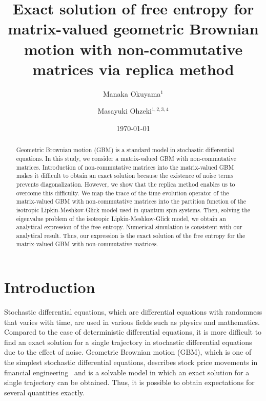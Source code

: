 \documentclass[
aps,
pre,
showpacs
]{revtex4-1}
\begin{document}
\title{Exact solution of free entropy for matrix-valued geometric Brownian motion with non-commutative matrices via replica method}
\author{Manaka Okuyama$^1$}
\author{Masayuki Ohzeki$^{1,2,3,4}$}

\begin{abstract} 
Geometric Brownian motion (GBM) is a standard model in stochastic differential equations.
In this study, we consider a matrix-valued GBM with non-commutative matrices.
Introduction of non-commutative matrices into the matrix-valued GBM makes it difficult to obtain an exact solution because the existence of noise terms prevents diagonalization. However, we show that the replica method enables us to overcome this difficulty.
We map the trace of the time evolution operator of the matrix-valued GBM with non-commutative matrices into the partition function of the isotropic Lipkin-Meshkov-Glick model used in quantum spin systems.
Then, solving the eigenvalue problem of the isotropic Lipkin-Meshkov-Glick model, we obtain an analytical expression of the free entropy.
Numerical simulation is consistent with our analytical result.
Thus, our expression is the exact solution of the free entropy for the matrix-valued GBM with non-commutative matrices.
\end{abstract}
\date{\today}
\maketitle

\section{Introduction}
Stochastic differential equations, which are differential equations with randomness that varies with time, are used in various fields such as physics and mathematics.
Compared to the case of deterministic differential equations, it is more difficult to find an exact solution for a single trajectory in stochastic differential equations due to the effect of noise.
Geometric Brownian motion (GBM), which is one of the simplest stochastic differential equations, describes stock price movements in financial engineering~\cite{CZ,Duffie,Hull,HO,KS,KP} and is a solvable model in which an exact solution for a single trajectory can be obtained.
Thus, it is possible to obtain expectations for several quantities exactly.
\end{document}
